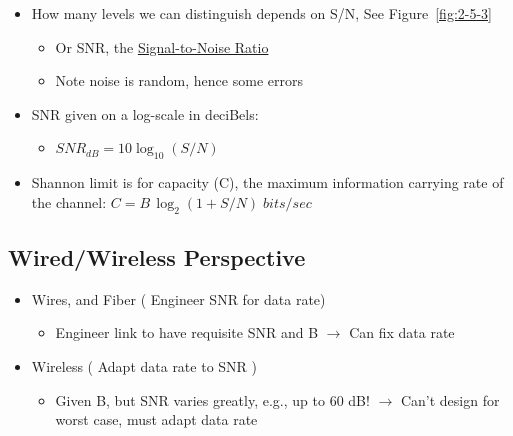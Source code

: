\documentclass[12pt]{ctexart}   %
\begin{document}
	\begin{itemize}
		\item How many levels we can distinguish depends on S/N, See Figure~\ref{fig:2-5-3}
		\begin{itemize}
			\item Or SNR, the \underline{Signal-to-Noise Ratio}
			\item Note noise is random, hence some errors
		\end{itemize}
		
		\item SNR given on a log-scale in deciBels:
		\begin{itemize}
			\item $SNR_{dB} = 10\log_{10} (S/N)$
		\end{itemize}
		
		\item Shannon limit is for capacity (C), the maximum information carrying rate of the channel: $ C = B \, \log_2 (1+S/N) \; bits/sec $
	\end{itemize}
	
	\subsection{Wired/Wireless Perspective}
	\begin{itemize}
		\item Wires, and Fiber         {\color{red} ( Engineer SNR for data rate)}
		\begin{itemize}
			\item Engineer link to have requisite SNR and B $\rightarrow$ Can fix data rate
		\end{itemize}
		
		\item Wireless        {\color{red}   ( Adapt data rate to SNR )}
		\begin{itemize}
			\item Given B, but SNR varies greatly, e.g., up to 60 dB! $\rightarrow$ Can't design for worst case, must adapt data rate
		\end{itemize}
	\end{itemize}
	
\end{document}
